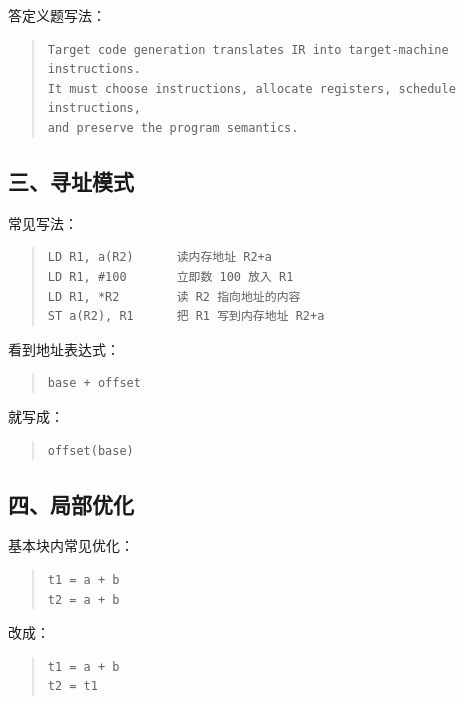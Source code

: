 \documentclass[UTF8,zihao=-4]{ctexart}
\begin{document}
答定义题写法：


\begin{quote}
\footnotesize
\begin{verbatim}
Target code generation translates IR into target-machine instructions.
It must choose instructions, allocate registers, schedule instructions,
and preserve the program semantics.
\end{verbatim}
\end{quote}


\subsection{三、寻址模式}


常见写法：


\begin{quote}
\footnotesize
\begin{verbatim}
LD R1, a(R2)      读内存地址 R2+a
LD R1, #100       立即数 100 放入 R1
LD R1, *R2        读 R2 指向地址的内容
ST a(R2), R1      把 R1 写到内存地址 R2+a
\end{verbatim}
\end{quote}


看到地址表达式：


\begin{quote}
\footnotesize
\begin{verbatim}
base + offset
\end{verbatim}
\end{quote}


就写成：


\begin{quote}
\footnotesize
\begin{verbatim}
offset(base)
\end{verbatim}
\end{quote}


\subsection{四、局部优化}


基本块内常见优化：


\begin{quote}
\footnotesize
\begin{verbatim}
t1 = a + b
t2 = a + b
\end{verbatim}
\end{quote}


改成：


\begin{quote}
\footnotesize
\begin{verbatim}
t1 = a + b
t2 = t1
\end{verbatim}
\end{quote}
\end{document}
